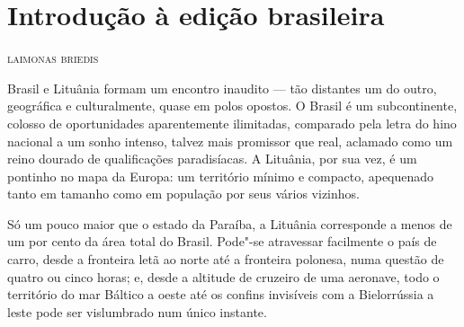 \chapter[Introdução à edição brasileira]{Introdução à edição brasileira }

\begin{flushright}
\textsc{laimonas briedis}
\end{flushright}

\setlength{\epigraphwidth}{.65\textwidth}
\begin{epigraphs} 

\medskip

\end{epigraphs}


\noindent{}Brasil e Lituânia formam um encontro inaudito --- tão distantes um do
outro, geográfica e culturalmente, quase em polos opostos. O Brasil é um
subcontinente, colosso de oportunidades aparentemente ilimitadas,
comparado pela letra do hino nacional a um sonho intenso, talvez mais
promissor que real, aclamado como um reino dourado de qualificações
paradisíacas. A Lituânia, por sua vez, é um pontinho no mapa da Europa:
um território mínimo e compacto, apequenado tanto em tamanho como em
população por seus vários vizinhos. 

Só um pouco maior que o estado da
Paraíba, a Lituânia corresponde a menos de um por cento da área total do
Brasil. Pode"-se atravessar facilmente o país de carro, desde a fronteira
letã ao norte até a fronteira polonesa, numa questão de quatro ou cinco
horas; e, desde a altitude de cruzeiro de uma aeronave, todo o
território do mar Báltico a oeste até os confins invisíveis com a
Bielorrússia a leste pode ser vislumbrado num único instante.

